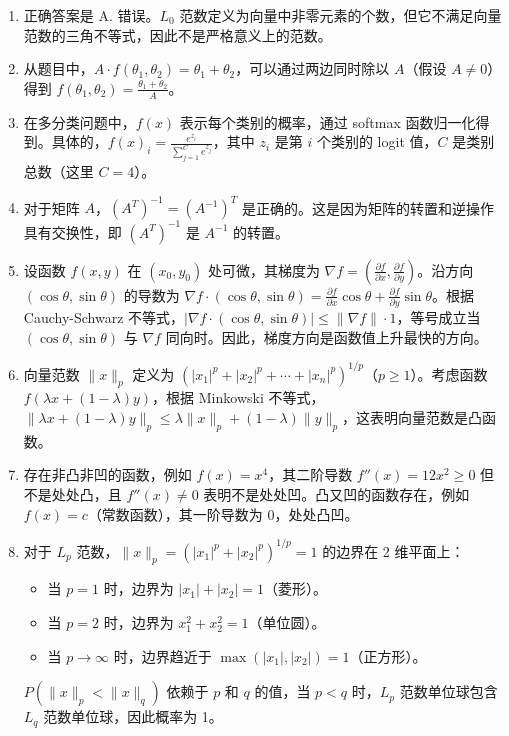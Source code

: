 \documentclass[a4paper,12pt]{book}
\begin{document}
\begin{enumerate}
    \item 正确答案是 A. 错误。$L_0$ 范数定义为向量中非零元素的个数，但它不满足向量范数的三角不等式，因此不是严格意义上的范数。
    \item 从题目中，$A \cdot f(\theta_1, \theta_2) = \theta_1 + \theta_2$，可以通过两边同时除以 $A$（假设 $A \neq 0$）得到 $f(\theta_1, \theta_2) = \frac{\theta_1 + \theta_2}{A}$。
    \item 在多分类问题中，$f(x)$ 表示每个类别的概率，通过 softmax 函数归一化得到。具体的，$f(x)_i = \frac{e^{z_i}}{\sum_{j=1}^C e^{z_j}}$，其中 $z_i$ 是第 $i$ 个类别的 logit 值，$C$ 是类别总数（这里 $C = 4$）。
    \item 对于矩阵 $A$，$(A^T)^{-1} = (A^{-1})^T$ 是正确的。这是因为矩阵的转置和逆操作具有交换性，即 $(A^T)^{-1}$ 是 $A^{-1}$ 的转置。
    \item 设函数 $f(x, y)$ 在 $(x_0, y_0)$ 处可微，其梯度为 $\nabla f = (\frac{\partial f}{\partial x}, \frac{\partial f}{\partial y})$。沿方向 $(\cos \theta, \sin \theta)$ 的导数为 $\nabla f \cdot (\cos \theta, \sin \theta) = \frac{\partial f}{\partial x} \cos \theta + \frac{\partial f}{\partial y} \sin \theta$。根据 Cauchy-Schwarz 不等式，$|\nabla f \cdot (\cos \theta, \sin \theta)| \leq \|\nabla f\| \cdot 1$，等号成立当 $(\cos \theta, \sin \theta)$ 与 $\nabla f$ 同向时。因此，梯度方向是函数值上升最快的方向。
    \item 向量范数 $\|x\|_p$ 定义为 $(|x_1|^p + |x_2|^p + \cdots + |x_n|^p)^{1/p}$（$p \geq 1$）。考虑函数 $f(\lambda x + (1-\lambda)y)$，根据 Minkowski 不等式，$\| \lambda x + (1-\lambda)y \|_p \leq \lambda \|x\|_p + (1-\lambda) \|y\|_p$，这表明向量范数是凸函数。
    \item 存在非凸非凹的函数，例如 $f(x) = x^4$，其二阶导数 $f''(x) = 12x^2 \geq 0$ 但不是处处凸，且 $f''(x) \neq 0$ 表明不是处处凹。凸又凹的函数存在，例如 $f(x) = c$（常数函数），其一阶导数为 0，处处凸凹。
    \item 对于 $L_p$ 范数，$ \|x\|_p = (|x_1|^p + |x_2|^p)^{1/p} = 1$ 的边界在 2 维平面上：
          \begin{itemize}
              \item 当 $p=1$ 时，边界为 $|x_1| + |x_2| = 1$（菱形）。
              \item 当 $p=2$ 时，边界为 $x_1^2 + x_2^2 = 1$（单位圆）。
              \item 当 $p \to \infty$ 时，边界趋近于 $\max(|x_1|, |x_2|) = 1$（正方形）。
          \end{itemize}
          $P(\|x\|_p < \|x\|_q)$ 依赖于 $p$ 和 $q$ 的值，当 $p < q$ 时，$L_p$ 范数单位球包含 $L_q$ 范数单位球，因此概率为 1。
\end{enumerate}
\end{document}
